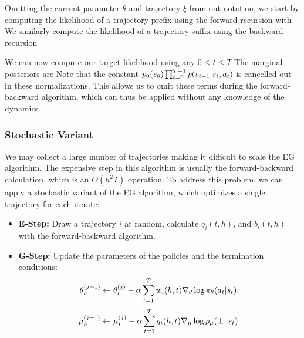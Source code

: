 Omitting the current parameter $\theta$ and trajectory $\xi$ from out notation, we start by computing the likelihood of a trajectory prefix
using the forward recursion
with
We similarly compute the likelihood of a trajectory suffix
using the backward recursion

We can now compute our target likelihood using any $0\le t\le T$
The marginal posteriors are
Note that the constant $p_0(s_0) \prod_{t=0}^{T-1} p(s_{t+1} \vert s_t, a_t)$ is cancelled out in these normalizations. This allows us to omit these terms during the forward-backward algorithm, which can thus be applied without any knowledge of the dynamics.

\subsubsection{Stochastic Variant}
We may collect a large number of trajectories making it difficult to scale the EG algorithm.
The expensive step in this algorithm is usually the forward-backward calculation, which is an $O(h^2T)$ operation.
To address this problem, we can apply a stochastic variant of the EG algorithm, which optimizes a single trajectory for each iterate:
\begin{itemize}
    \item \textbf{E-Step: } Draw a trajectory $i$ at random, calculate $q_i(t,h)$, and $b_i(t,h)$ with the forward-backward algorithm.
   \item \textbf{G-Step: } Update the parameters of the policies and the termination conditions:
    \[
\theta_h^{(j+1)} \leftarrow \theta_i^{(j)} - \alpha  \sum_{t=1}^{T} w_i(h,t) \nabla_\theta \log \pi_\theta(a_t \vert s_t).
\]
\[
\mu_h^{(j+1)} \leftarrow \mu_i^{(j)} - \alpha \sum_{t=1}^{T} q_i(h,t) \nabla_\mu \log \rho_\mu(\perp \vert s_t).
\]
\end{itemize}


